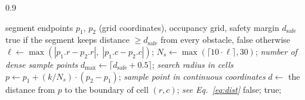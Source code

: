 \documentclass[lettersize,journal]{IEEEtran}
\begin{document}
\begin{algorithm}[!t]
\caption{IsLineFree }
\label{alg:islinefree}
\begin{spacing}{0.9}
\begin{algorithmic}[1]
\REQUIRE segment endpoints $p_1$, $p_2$ (grid coordinates), occupancy grid, safety margin $d_{\mathrm{safe}}$
\ENSURE true if the segment keeps distance $\geq d_{\mathrm{safe}}$ from every obstacle, false otherwise
\STATE $\ell \gets \max(|p_1.r - p_2.r|,\; |p_1.c - p_2.c|)$;
\STATE $N_s \gets \max(\lceil 10 \cdot \ell \rceil, 30)$; \quad\textit{number of dense sample points}
\STATE $d_{\max} \gets \lceil d_{\mathrm{safe}} + 0.5 \rceil$; \quad\textit{search radius in cells}
\STATE $p \gets p_1 + (k / N_s) \cdot (p_2 - p_1)$; \quad\textit{sample point in continuous coordinates}
\STATE $d \gets$ the distance from $p$ to the boundary of cell $(r, c)$; \quad\textit{see Eq.~\textcolor{blue}{\eqref{eq:dist}}}
\STATE \RETURN false;
\ENDIF
\ENDIF
\ENDFOR
\ENDFOR
\RETURN true;
\end{algorithmic}
\end{spacing}
\end{algorithm}
\end{document}
